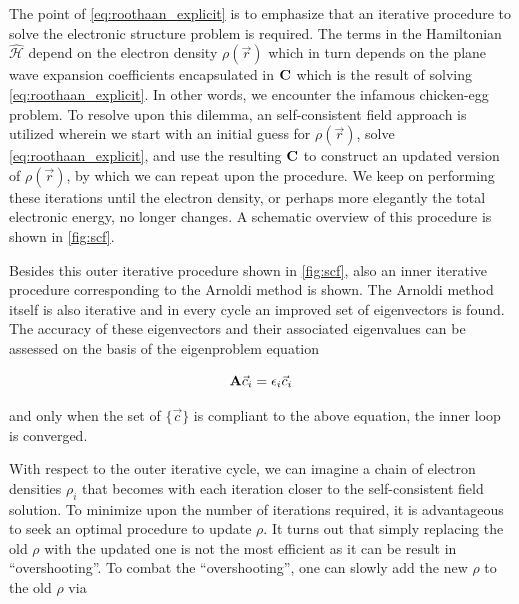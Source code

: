 The point of \cref{eq:roothaan_explicit} is to emphasize that an iterative procedure to solve the electronic structure problem is required. The terms in the Hamiltonian $\hat{\mathcal{H}}$ depend on the electron density $\rho(\vec{r})$ which in turn depends on the plane wave expansion coefficients encapsulated in $\mathbf{C}$ which is the result of solving \cref{eq:roothaan_explicit}. In other words, we encounter the infamous chicken-egg problem. To resolve upon this dilemma, an self-consistent field approach is utilized wherein we start with an initial guess for $\rho(\vec{r})$, solve \cref{eq:roothaan_explicit}, and use the resulting $\mathbf{C}$ to construct an updated version of $\rho(\vec{r})$, by which we can repeat upon the procedure. We keep on performing these iterations until the electron density, or perhaps more elegantly the total electronic energy, no longer changes. A schematic overview of this procedure is shown in \cref{fig:scf}.

\begin{Figure}
    \centering
    \resizebox{0.9 \textwidth}{!}{
        
    }
    \label{fig:scf}
\end{Figure}

Besides this outer iterative procedure shown in \cref{fig:scf}, also an inner iterative procedure corresponding to the Arnoldi method is shown. The Arnoldi method itself is also iterative and in every cycle an improved set of eigenvectors is found. The accuracy of these eigenvectors and their associated eigenvalues can be assessed on the basis of the eigenproblem equation

\begin{equation}
    \mathbf{A} \vec{c}_{i} = \epsilon_{i} \vec{c}_{i}
\end{equation}

and only when the set of $\{ \vec{c} \}$ is compliant to the above equation, the inner loop is converged.

With respect to the outer iterative cycle, we can imagine a chain of electron densities $\rho_{i}$ that becomes with each iteration closer to the self-consistent field solution. To minimize upon the number of iterations required, it is advantageous to seek an optimal procedure to update $\rho$. It turns out that simply replacing the old $\rho$ with the updated one is not the most efficient as it can be result in ``overshooting''. To combat the ``overshooting'', one can slowly add the new $\rho$ to the old $\rho$ via


